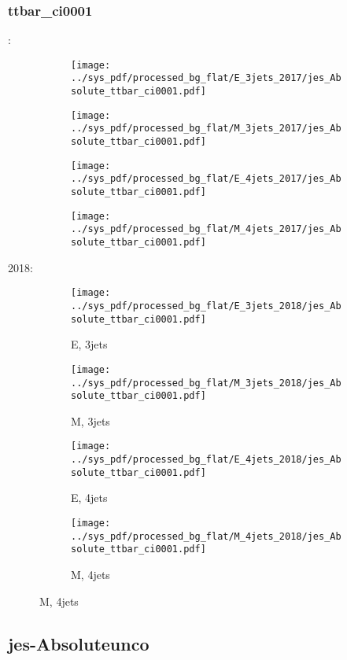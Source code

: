 \documentclass{beamer}
\begin{document}
\begin{frame}
\frametitle{ttbar_ci0001}
\fontsize{5}{1}:
\begin{figure}
\centering
\begin{subfigure}[b]{0.24\textwidth}
\texttt{[image: ../sys\_pdf/processed\_bg\_flat/E\_3jets\_2017/jes\_Absolute\_ttbar\_ci0001.pdf]}
\end{subfigure}
\begin{subfigure}[b]{0.24\textwidth}
\texttt{[image: ../sys\_pdf/processed\_bg\_flat/M\_3jets\_2017/jes\_Absolute\_ttbar\_ci0001.pdf]}
\end{subfigure}
\begin{subfigure}[b]{0.24\textwidth}
\texttt{[image: ../sys\_pdf/processed\_bg\_flat/E\_4jets\_2017/jes\_Absolute\_ttbar\_ci0001.pdf]}
\end{subfigure}
\begin{subfigure}[b]{0.24\textwidth}
\texttt{[image: ../sys\_pdf/processed\_bg\_flat/M\_4jets\_2017/jes\_Absolute\_ttbar\_ci0001.pdf]}
\end{subfigure}
\end{figure}
2018:
\begin{figure}
\centering
\begin{subfigure}[b]{0.24\textwidth}
\texttt{[image: ../sys\_pdf/processed\_bg\_flat/E\_3jets\_2018/jes\_Absolute\_ttbar\_ci0001.pdf]}
\captionsetup{font=tiny}
\caption{E, 3jets}
\end{subfigure}
\begin{subfigure}[b]{0.24\textwidth}
\texttt{[image: ../sys\_pdf/processed\_bg\_flat/M\_3jets\_2018/jes\_Absolute\_ttbar\_ci0001.pdf]}
\captionsetup{font=tiny}
\caption{M, 3jets}
\end{subfigure}
\begin{subfigure}[b]{0.24\textwidth}
\texttt{[image: ../sys\_pdf/processed\_bg\_flat/E\_4jets\_2018/jes\_Absolute\_ttbar\_ci0001.pdf]}
\captionsetup{font=tiny}
\caption{E, 4jets}
\end{subfigure}
\begin{subfigure}[b]{0.24\textwidth}
\texttt{[image: ../sys\_pdf/processed\_bg\_flat/M\_4jets\_2018/jes\_Absolute\_ttbar\_ci0001.pdf]}
\captionsetup{font=tiny}
\caption{M, 4jets}
\end{subfigure}
\end{figure}
\end{frame}


\subsection{jes-Absoluteunco}
\end{document}
